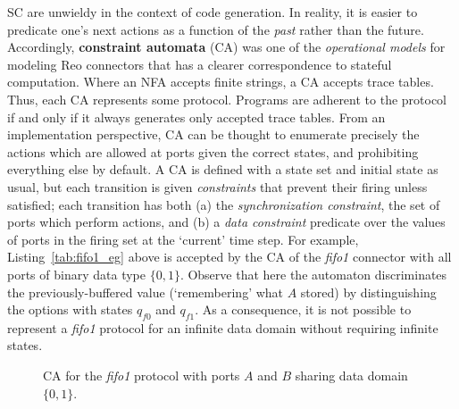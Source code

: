 SC are unwieldy in the context of code generation. In reality, it is easier to predicate one's next actions as a function of the \textit{past} rather than the future. Accordingly, \textbf{constraint automata} (CA) was one of the \textit{operational models} for modeling Reo connectors that has a clearer correspondence to stateful computation. Where an NFA accepts finite strings, a CA accepts trace tables. Thus, each CA represents some protocol. Programs are adherent to the protocol if and only if it always generates only accepted trace tables. From an implementation perspective, CA can be thought to enumerate precisely the actions which are allowed at ports given the correct states, and prohibiting everything else by default. A CA is defined with a state set and initial state as usual, but each transition is given \textit{constraints} that prevent their firing unless satisfied; each transition has both (a) the \textit{synchronization constraint}, the set of ports which perform actions, and (b) a \textit{data constraint} predicate over the values of ports in the firing set at the `current' time step. For example, Listing~\ref{tab:fifo1_eg} above is accepted by the CA of the \textit{fifo1} connector with all ports of binary data type $\{0,1\}$. Observe that here the automaton discriminates the previously-buffered value (`remembering' what $A$ stored) by distinguishing the options with states $q_{f0}$ and $q_{f1}$. As a consequence, it is not possible to represent a \textit{fifo1} protocol for an infinite data domain without requiring infinite states.
\begin{figure}[ht]
	\centering
	\caption[CA for fifo1 connector.]{CA for the \textit{fifo1} protocol with ports $A$ and $B$ sharing data domain $\{0,1\}$.}
	\label{fig:fifo1_ca}
\end{figure}

